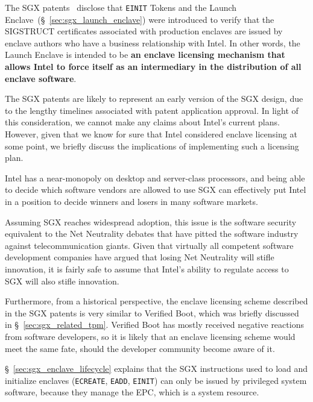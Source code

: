 The SGX patents~\cite{intel2013patent1, intel2013patent2} disclose that
\texttt{EINIT} Tokens and the Launch Enclave~(\S~\ref{sec:sgx_launch_enclave})
were introduced to verify that the SIGSTRUCT certificates associated with
production enclaves are issued by enclave authors who have a business
relationship with Intel. In other words, the Launch Enclave is intended to be
\textbf{an enclave licensing mechanism that allows Intel to force itself as an
intermediary in the distribution of all enclave software}.

The SGX patents are likely to represent an early version of the SGX design, due
to the lengthy timelines associated with patent application approval.
In light of this consideration, we cannot make any claims about Intel's current
plans. However, given that we know for sure that Intel considered enclave
licensing at some point, we briefly discuss the implications of implementing
such a licensing plan.

Intel has a near-monopoly on desktop and server-class processors, and being
able to decide which software vendors are allowed to use SGX can effectively
put Intel in a position to decide winners and losers in many software markets.

Assuming SGX reaches widespread adoption, this issue is the software security
equivalent to the Net Neutrality debates that have pitted the software industry
against telecommunication giants. Given that virtually all competent software
development companies have argued that losing Net Neutrality will stifle
innovation, it is fairly safe to assume that Intel's ability to regulate access
to SGX will also stifle innovation.

Furthermore, from a historical perspective, the enclave licensing scheme
described in the SGX patents is very similar to Verified Boot, which was
briefly discussed in \S~\ref{sec:sgx_related_tpm}. Verified Boot has mostly
received negative reactions from software developers, so it is likely that an
enclave licensing scheme would meet the same fate, should the developer
community become aware of it.


\label{sec:sgx_provisioning_privacy}

\S~\ref{sec:sgx_enclave_lifecycle} explains that the SGX instructions used to
load and initialize enclaves (\texttt{ECREATE}, \texttt{EADD}, \texttt{EINIT})
can only be issued by privileged system software, because they manage the EPC,
which is a system resource.

